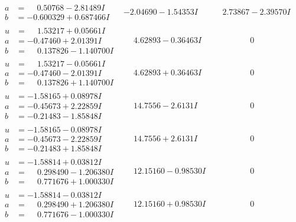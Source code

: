\documentclass[1p]{elsarticle_modified}
\theoremstyle{definition}
\begin{document}
$$\begin{array}{c|c|c}
\begin{aligned}
a &= \phantom{-}0.50768 - 2.81489 I \\
b &= -0.600329 + 0.687466 I\end{aligned}
 & -2.04690 - 1.54353 I & \phantom{-}2.73867 - 2.39570 I \\ \hline\begin{aligned}
u &= \phantom{-}1.53217 + 0.05661 I \\
a &= -0.47460 + 2.01391 I \\
b &= \phantom{-}0.137826 - 1.140700 I\end{aligned}
 & \phantom{-}4.62893 - 0.36463 I & \phantom{-0.000000 } 0 \\ \hline\begin{aligned}
u &= \phantom{-}1.53217 - 0.05661 I \\
a &= -0.47460 - 2.01391 I \\
b &= \phantom{-}0.137826 + 1.140700 I\end{aligned}
 & \phantom{-}4.62893 + 0.36463 I & \phantom{-0.000000 } 0 \\ \hline\begin{aligned}
u &= -1.58165 + 0.08978 I \\
a &= -0.45673 + 2.22859 I \\
b &= -0.21483 - 1.85848 I\end{aligned}
 & \phantom{-}14.7556 - 2.6131 I & \phantom{-0.000000 } 0 \\ \hline\begin{aligned}
u &= -1.58165 - 0.08978 I \\
a &= -0.45673 - 2.22859 I \\
b &= -0.21483 + 1.85848 I\end{aligned}
 & \phantom{-}14.7556 + 2.6131 I & \phantom{-0.000000 } 0 \\ \hline\begin{aligned}
u &= -1.58814 + 0.03812 I \\
a &= \phantom{-}0.298490 - 1.206380 I \\
b &= \phantom{-}0.771676 + 1.000330 I\end{aligned}
 & \phantom{-}12.15160 - 0.98530 I & \phantom{-0.000000 } 0 \\ \hline\begin{aligned}
u &= -1.58814 - 0.03812 I \\
a &= \phantom{-}0.298490 + 1.206380 I \\
b &= \phantom{-}0.771676 - 1.000330 I\end{aligned}
 & \phantom{-}12.15160 + 0.98530 I & \phantom{-0.000000 } 0 \\ \hline\begin{aligned}

\end{aligned}
\end{array}$$
\end{document}
